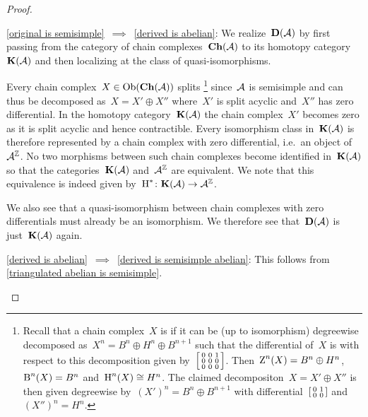 \documentclass[a4paper,10pt]{scrartcl}
\begin{document}
\begin{proof}
  \leavevmode
  \begin{implicationslist}
    \item[\ref{original is semisimple}~$\implies$~\ref{derived is abelian}:]
      We realize~$\mathbf{D}(\mathcal{A})$ by first passing from the category of chain complexes~$\mathbf{Ch}(\mathcal{A})$ to its homotopy category~$\mathbf{K}(\mathcal{A})$ and then localizing at the class of quasi-isomorphisms.
      
      Every chain complex~$X \in \operatorname{Ob}(\mathbf{Ch}(\mathcal{A}))$ splits%
      \footnote{Recall that a chain complex~$X$ is  if it can be (up to isomorphism) degreewise decomposed as~$X^n = B^n \oplus H^n \oplus B^{n+1}$ such that the differential of~$X$ is with respect to this decomposition given by~$\begin{bsmallmatrix} 0 & 0 & 1 \\ 0 & 0 & 0 \\ 0 & 0 & 0 \end{bsmallmatrix}$.
      Then~$\operatorname{Z}^n(X) = B^n \oplus H^n$,~$\operatorname{B}^n(X) = B^n$ and~$\operatorname{H}^n(X) \cong H^n$.
      The claimed decompositon~$X = X' \oplus X''$ is then given degreewise by~$(X')^n = B^n \oplus B^{n+1}$ with differential~$\begin{bsmallmatrix} 0 & 1 \\ 0 & 0 \end{bsmallmatrix}$ and~$(X'')^n = H^n$.}
      since~$\mathcal{A}$ is semisimple and can thus be decomposed as~$X = X' \oplus X''$ where~$X'$ is split acyclic and~$X''$ has zero differential.
      In the homotopy category~$\mathbf{K}(\mathcal{A})$ the chain complex~$X'$ becomes zero as it is split acyclic and hence contractible.
      Every isomorphism class in~$\mathbf{K}(\mathcal{A})$ is therefore represented by a chain complex with zero differential, i.e.\ an object of~$\mathcal{A}^{\mathbb{Z}}$.
      No two morphisms between such chain complexes become identified in~$\mathbf{K}(\mathcal{A})$ so that the categories~$\mathbf{K}(\mathcal{A})$ and~$\mathcal{A}^{\mathbb{Z}}$ are equivalent.
      We note that this equivalence is indeed given by~$\operatorname{H}^* \colon \mathbf{K}(\mathcal{A}) \to \mathcal{A}^{\mathbb{Z}}$.
      
      We also see that a quasi-isomorphism between chain complexes with zero differentials must already be an isomorphism.
      We therefore see that~$\mathbf{D}(\mathcal{A})$ is just~$\mathbf{K}(\mathcal{A})$ again.
      
    \item[\ref{derived is abelian}~$\implies$~\ref{derived is semisimple abelian}:]
      This follows from \cref{triangulated abelian is semisimple}.
    

\end{implicationslist}
\end{proof}
\end{document}
